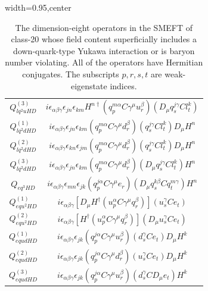 \begin{table}[H]
\begin{center}
\begin{adjustbox}{width=0.95\textwidth,center}
\begin{minipage}[t]{7.1cm}
\begin{tabular}[t]{c|c}
%
$Q_{lq^2uHD}^{(3)}$  &  $i \epsilon_{\alpha\beta\gamma} \epsilon_{jn} \epsilon_{km} H^{n\dag} (q_p^{m\alpha} C \gamma^\mu u_r^\beta) (D_\mu q_s^{j\gamma} C l_t^k)$ \\
%
$Q_{lq^2dHD}^{(1)}$  &  $i \epsilon_{\alpha\beta\gamma} \epsilon_{jn} \epsilon_{km} (q_p^{m\alpha} C \gamma^\mu d_r^\beta) (q_s^{j\gamma} C l_t^k) D_\mu H^n$ \\
%
$Q_{lq^2dHD}^{(2)}$  &  $i \epsilon_{\alpha\beta\gamma} \epsilon_{kn} \epsilon_{jm} (q_p^{m\alpha} C \gamma^\mu d_r^\beta) (q_s^{j\gamma} C l_t^k) D_\mu H^n$ \\
%
$Q_{lq^2dHD}^{(3)}$  &  $i \epsilon_{\alpha\beta\gamma} \epsilon_{jn} \epsilon_{km} (q_p^{m\alpha} C \gamma^\mu d_r^\beta) (D_\mu q_s^{j\gamma} C l_t^k) H^n$ \\
%
$Q_{eq^3HD}$  &  $i \epsilon_{\alpha\beta\gamma} \epsilon_{mn} \epsilon_{jk} (q_p^{j\alpha} C \gamma^\mu e_r) (D_\mu q_s^{k\beta} C q_t^{m\gamma}) H^n$ \\
%
$Q_{equ^2HD}^{(1)}$  &  $i \epsilon_{\alpha\beta\gamma} [D_\mu H^\dag (u_p^\alpha C \gamma^\mu q_r^\beta)] (u_s^\gamma C e_t)$ \\
%
$Q_{equ^2HD}^{(2)}$  &  $i \epsilon_{\alpha\beta\gamma} [H^\dag (u_p^\alpha C \gamma^\mu q_r^\beta)] (D_\mu u_s^\gamma C e_t)$ \\
%
$Q_{equdHD}^{(1)}$  &  $i \epsilon_{\alpha\beta\gamma} \epsilon_{jk} (q_p^{j\alpha} C \gamma^\mu u_r^\beta) (d_s^\gamma C e_t) D_\mu H^k$ \\
%
$Q_{equdHD}^{(2)}$  &  $i \epsilon_{\alpha\beta\gamma} \epsilon_{jk} (q_p^{j\alpha} C \gamma^\mu d_r^\beta) (u_s^\gamma C e_t) D_\mu H^k$ \\
%
$Q_{equdHD}^{(3)}$  &  $i \epsilon_{\alpha\beta\gamma} \epsilon_{jk} (q_p^{j\alpha} C \gamma^\mu u_r^\beta) (d_s^\gamma C D_\mu e_t) H^k$ 
\end{tabular}
\end{minipage}
\end{adjustbox}
\end{center}
\caption{The dimension-eight operators in the SMEFT of class-20 whose field content superficially includes a down-quark-type Yukawa interaction or is baryon number violating.  
All of the operators have Hermitian conjugates. 
The subscripts $p, r, s, t$ are weak-eigenstate indices.}
\label{tab:smeft8class_20_qd_slashedB}
\end{table}
